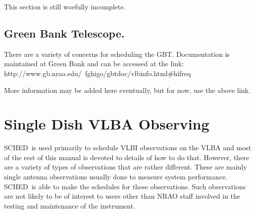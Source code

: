 \documentclass{report}
\newcommand{\schedb}{{\sc SCHED~}}
\begin{document}
This section is still woefully incomplete.


\subsection{\label{SSEC:GBT}Green Bank Telescope.}

There are a variety of concerns for scheduling the GBT.  Documentation
is maintained at Green Bank and can be accessed at the link:
{http://www.gb.nrao.edu/~fghigo/gbtdoc/vlbinfo.html\#hifreq}

More information may be added here eventually, but for now, use the
above link.

\section{\label{SEC:SPECIALVLBA}Single Dish VLBA Observing}

\schedb is used primarily to schedule VLBI observations on the VLBA
and most of the rest of this manual is devoted to details of how to
do that.  However, there are a variety of types of observations that
are rather different.  These are mainly single antenna observations
usually done to measure system performance.  \schedb is able to
make the schedules for these observations.  Such observations are
not likely to be of interest to users other than NRAO staff involved
in the testing and maintenance of the instrument.
\end{document}
